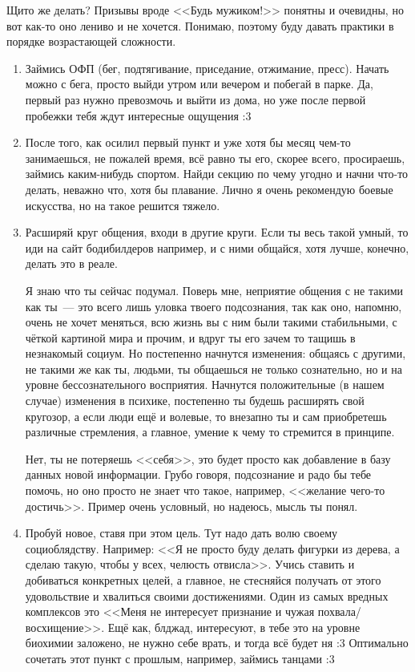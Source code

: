 \documentclass[a4paper,14pt,oneside]{memoir}
\begin{document}
Щито же делать? Призывы вроде <<Будь мужиком!>> понятны и очевидны, но вот как-то оно лениво и не хочется. Понимаю, поэтому буду давать практики в порядке возрастающей сложности.

\begin{enumerate}
\item Займись ОФП (бег, подтягивание, приседание, отжимание, пресс). Начать можно с бега, просто выйди утром или вечером и побегай в парке. Да, первый раз нужно превозмочь и выйти из дома, но уже после первой пробежки тебя ждут интересные ощущения :3
\item После того, как осилил первый пункт и уже хотя бы месяц чем-то занимаешься, не пожалей время, всё равно ты его, скорее всего, просираешь, займись каким-нибудь спортом. Найди секцию по чему угодно и начни что-то делать, неважно что, хотя бы плавание. Лично я очень рекомендую боевые искусства, но на такое решится тяжело.
\item Расширяй круг общения, входи в другие круги. Если ты весь такой умный, то иди на сайт бодибилдеров например, и с ними общайся, хотя лучше, конечно, делать это в реале.

Я знаю что ты сейчас подумал. Поверь мне, неприятие общения с не такими как ты~--- это всего лишь уловка твоего подсознания, так как оно, напомню, очень не хочет меняться, всю жизнь вы с ним были такими стабильными, с чёткой картиной мира и прочим, и вдруг ты его зачем то тащишь в незнакомый социум. Но постепенно начнутся изменения: общаясь с другими, не такими же как ты, людьми, ты общаешься не только сознательно, но и на уровне бессознательного восприятия. Начнутся положительные (в нашем случае) изменения в психике, постепенно ты будешь расширять свой кругозор, а если люди ещё и волевые, то внезапно ты и сам приобретешь различные стремления, а главное, умение к чему то стремится в принципе.

Нет, ты не потеряешь <<себя>>, это будет просто как добавление в базу данных новой информации. Грубо говоря, подсознание и радо бы тебе помочь, но оно просто не знает что такое, например, <<желание чего-то достичь>>. Пример очень условный, но надеюсь, мысль ты понял.
\item Пробуй новое, ставя при этом цель. Тут надо дать волю своему социоблядству. Например: <<Я не просто буду делать фигурки из дерева, а сделаю такую, чтобы у всех, челюсть отвисла>>. Учись ставить и добиваться конкретных целей, а главное, не стесняйся получать от этого удовольствие и хвалиться своими достижениями. Один из самых вредных комплексов это <<Меня не интересует признание и чужая похвала/восхищение>>. Ещё как, блджад, интересуют, в тебе это на уровне биохимии заложено, не нужно себе врать, и тогда всё будет ня :3 Оптимально сочетать этот пункт с прошлым, например, займись танцами :3


\end{enumerate}
\end{document}
